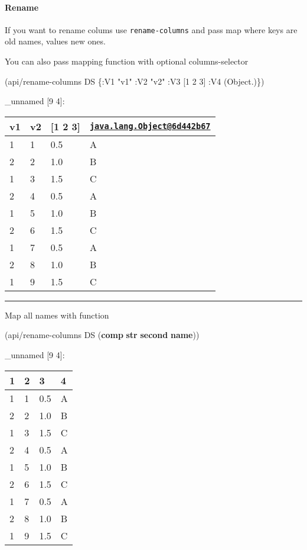 \documentclass[]{article}
\newenvironment{Shaded}{\begin{snugshade}}{\end{snugshade}}
\newcommand{\AttributeTok}[1]{\textcolor[rgb]{0.77,0.63,0.00}{#1}}
\newcommand{\DecValTok}[1]{\textcolor[rgb]{0.00,0.00,0.81}{#1}}
\newcommand{\KeywordTok}[1]{\textcolor[rgb]{0.13,0.29,0.53}{\textbf{#1}}}
\newcommand{\NormalTok}[1]{#1}
\newcommand{\StringTok}[1]{\textcolor[rgb]{0.31,0.60,0.02}{#1}}
\let\oldparagraph\paragraph
\renewcommand{\paragraph}[1]{\oldparagraph{#1}\mbox{}}
\begin{document}
\hypertarget{rename}{%
\paragraph{Rename}\label{rename}}

If you want to rename colums use \texttt{rename-columns} and pass map
where keys are old names, values new ones.

You can also pass mapping function with optional columns-selector

\begin{Shaded}
\begin{Highlighting}[]
\NormalTok{(api/rename-columns DS \{}\AttributeTok{:V1} \StringTok{"v1"}
                        \AttributeTok{:V2} \StringTok{"v2"}
                        \AttributeTok{:V3}\NormalTok{ [}\DecValTok{1} \DecValTok{2} \DecValTok{3}\NormalTok{]}
                        \AttributeTok{:V4}\NormalTok{ (Object.)\})}
\end{Highlighting}
\end{Shaded}

\_unnamed {[}9 4{]}:

\begin{longtable}[]{@{}llll@{}}
\toprule
v1 & v2 & {[}1 2 3{]} &
\href{mailto:java.lang.Object@6d442b67}{\nolinkurl{java.lang.Object@6d442b67}}\tabularnewline
\midrule
\endhead
1 & 1 & 0.5 & A\tabularnewline
2 & 2 & 1.0 & B\tabularnewline
1 & 3 & 1.5 & C\tabularnewline
2 & 4 & 0.5 & A\tabularnewline
1 & 5 & 1.0 & B\tabularnewline
2 & 6 & 1.5 & C\tabularnewline
1 & 7 & 0.5 & A\tabularnewline
2 & 8 & 1.0 & B\tabularnewline
1 & 9 & 1.5 & C\tabularnewline
\bottomrule
\end{longtable}

\begin{center}\rule{0.5\linewidth}{0.5pt}\end{center}

Map all names with function

\begin{Shaded}
\begin{Highlighting}[]
\NormalTok{(api/rename-columns DS (}\KeywordTok{comp} \KeywordTok{str} \KeywordTok{second} \KeywordTok{name}\NormalTok{))}
\end{Highlighting}
\end{Shaded}

\_unnamed {[}9 4{]}:

\begin{longtable}[]{@{}llll@{}}
\toprule
1 & 2 & 3 & 4\tabularnewline
\midrule
\endhead
1 & 1 & 0.5 & A\tabularnewline
2 & 2 & 1.0 & B\tabularnewline
1 & 3 & 1.5 & C\tabularnewline
2 & 4 & 0.5 & A\tabularnewline
1 & 5 & 1.0 & B\tabularnewline
2 & 6 & 1.5 & C\tabularnewline
1 & 7 & 0.5 & A\tabularnewline
2 & 8 & 1.0 & B\tabularnewline
1 & 9 & 1.5 & C\tabularnewline
\bottomrule
\end{longtable}
\end{document}
